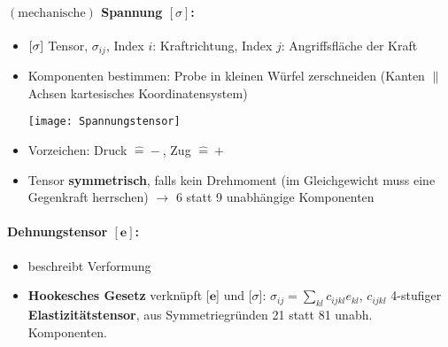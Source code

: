 \documentclass[a4paper,12pt]{article}
\begin{document}
\paragraph*{$\mathrm{(mechanische)}$ Spannung $ [\sigma]$:} \begin{itemize}
	\item $[\bf{\sigma}]$ Tensor,  $ \sigma_{ij} $, Index $ i $: Kraftrichtung, Index $ j $: Angriffsfläche der Kraft
	\item Komponenten bestimmen: Probe in kleinen Würfel zerschneiden (Kanten $ \parallel $ Achsen kartesisches Koordinatensystem)\\
	\begin{center}
		\texttt{[image: Spannungstensor]}
	\end{center}
	\item Vorzeichen: Druck $ \hat = -$, Zug $ \hat = +$ 
	\item Tensor \textbf{symmetrisch}, falls kein Drehmoment (im Gleichgewicht muss eine Gegenkraft herrschen) $ \rightarrow $ 6 statt 9 unabhängige Komponenten
\end{itemize}
\paragraph*{Dehnungstensor $ [\textbf{e}] $:}
\begin{itemize}
	\item beschreibt Verformung
	\item \textbf{Hookesches Gesetz} verknüpft [$ \textbf{e} $] und [$ \sigma $]: $ \sigma_{ij}= \sum\limits_{kl} c_{ijkl}e_{kl} $, $ c_{ijkl} $ 4-stufiger \textbf{Elastizitätstensor}, aus Symmetriegründen 21 statt 81 unabh. Komponenten.
\end{itemize}
\end{document}
